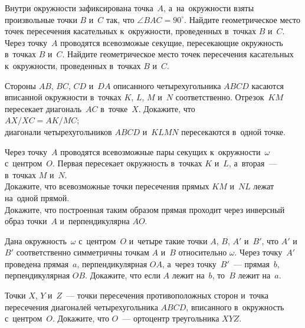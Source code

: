 


\begin{problems}

\item
\subproblem
Внутри окружности зафиксирована точка~$A$, а~на~окружности взяты произвольные
точки $B$ и~$C$ так, что $\angle BAC = 90^{\circ}$.
Найдите геометрическое место точек пересечения касательных к~окружности,
проведенных в~точках $B$ и~$C$.
\\
\subproblem
Через точку~$A$ проводятся всевозможые секущие, пересекающие окружность
в~точках $B$ и~$C$.
Найдите геометрическое место точек пересечения касательных к~окружности,
проведенных в~точках $B$ и~$C$.

\item
Стороны $AB$, $BC$, $CD$ и~$DA$ описанного четырехугольника $ABCD$ касаются
вписанной окружности в~точках $K$, $L$, $M$ и~$N$ соответственно.
Отрезок~$KM$ пересекает диагональ~$AC$ в~точке~$X$.
Докажите, что
\\
\subproblem
$AX / XC = AK / MC$;
\\
\subproblem
диагонали четырехугольников $ABCD$ и~$KLMN$ пересекаются в~одной точке.

\item
Через точку~$A$ проводятся всевозможные пары секущих к~окружности~$\omega$
с~центром~$O$.
Первая пересекает окружность в~точках $K$ и~$L$, а~вторая~---
в~точках $M$ и~$N$.
\\
\subproblem
Докажите, что всевозможные точки пересечения прямых $KM$ и~$NL$ лежат на~одной
прямой.
\\
\subproblem
Докажите, что построенная таким образом прямая проходит через инверсный образ
точки~$A$ и~перпендикулярна $AO$.

\item
Дана окружность~$\omega$ с~центром~$O$ и~четыре такие точки
$A$, $B$, $A'$ и~$B'$, что $A'$ и~$B'$ соответственно симметричны
точкам $A$ и~$B$ относительно $\omega$.
Через точку~$A'$ проведена прямая~$a$, перпендикулярная $OA$,
а~через точку~$B'$~--- прямая~$b$, перпендикулярная $OB$.
Докажите, что если $A$ лежит на~$b$, то~$B$ лежит на~$a$.

\item
Точки $X$, $Y$ и~$Z$~--- точки пересечения противоположных сторон и~точка
пересечения диагоналей четырехугольника $ABCD$, вписанного в~окружность
с~центром~$O$.
Докажите, что $O$~--- ортоцентр треугольника $XYZ$.


\end{problems}
